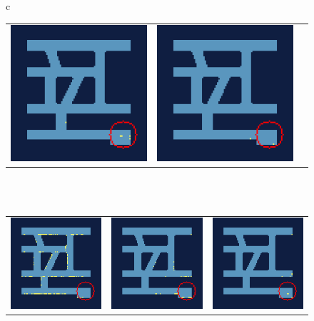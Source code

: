 \begin{figure} [htp]
\begin{center}
\begin{tabular}{c}
\begin{tabular}{ccc}
                \includegraphics[width=0.25\columnwidth]{figures/evaluation/algorithms/training_example/acktr/25_k.png} & 
                \includegraphics[width=0.25\columnwidth]{figures/evaluation/algorithms/training_example/acktr/29_k.png} \\
            \end{tabular} \\
             \\
            \addlinespace[0.5cm]
            \begin{tabular}{ccc}
                \includegraphics[width=0.25\columnwidth]{figures/evaluation/algorithms/training_example/acktr/30_k.png} & 
                \includegraphics[width=0.25\columnwidth]{figures/evaluation/algorithms/training_example/acktr/37_k.png} & 
                \includegraphics[width=0.25\columnwidth]{figures/evaluation/algorithms/training_example/acktr/44_k.png} \\

\end{tabular}
\end{tabular}
\end{center}
\end{figure}
